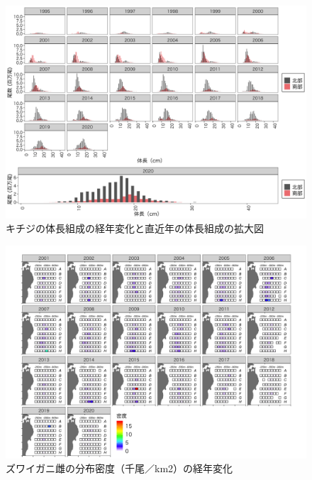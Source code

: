 \documentclass[11pt]{article} %
\begin{document}
\begin{linenumbers}
\begin{figure}[h]
  \centering
  \includegraphics[width = 14cm]{キチジlength.png}
  \caption{キチジの体長組成の経年変化と直近年の体長組成の拡大図}
\end{figure}

\begin{figure}[h]
  \centering
  \includegraphics[width = 14cm]{ズワイガニ雌dens.png}
  \caption{ズワイガニ雌の分布密度（千尾／km2）の経年変化}
\end{figure}


\end{linenumbers}
\end{document}
